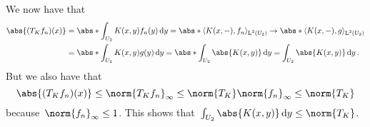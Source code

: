 We now have that
\begin{align*}
        \abs{ (T_K f_n)(x) }
  &=    \abs*{ \int_{U_2} K(x,y) f_n(y) \dd{y} }
   =    \abs*{ \bil{ K(x,-) , f_n }_{\Lp^2(U_2)} }
   \to  \abs*{ \bil{ K(x,-), g}_{\Lp^2(U_2)} }  \\
  &=    \abs*{ \int_{U_2} K(x,y) g(y) \dd{y} }
   =    \abs*{ \int_{U_2} \abs{K(x,y)} \dd{y} }
   =    \int_{U_2} \abs{K(x,y)} \dd{y} \,.
\end{align*}
But we also have that
\[
        \abs{ (T_K f_n)(x) }
  \leq  \norm{ T_K f_n }_\infty
  \leq  \norm{ T_K } \norm{f_n}_\infty
  \leq  \norm{ T_K }
\]
because~$\norm{f_n}_\infty \leq 1$.
This shows that~$\int_{U_2} \abs{K(x,y)} \dd{y} \leq \norm{ T_K }$.





% 
% 











